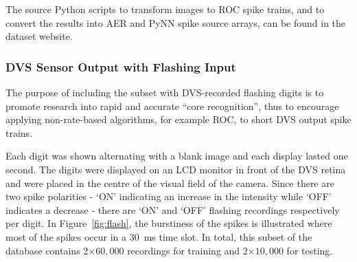 The source Python scripts to transform images to ROC spike trains, and to convert the results into AER and PyNN spike source arrays, can be found in the dataset website.

\subsubsection{DVS Sensor Output with Flashing Input}
\label{subsec_flash}
The purpose of including the subset with DVS-recorded flashing digits is to promote research into rapid and accurate ``core recognition'', thus to encourage applying non-rate-based algorithms, for example ROC, to short DVS output spike trains.

Each digit was shown alternating with a blank image and each display lasted one second.
The digits were displayed on an LCD monitor in front of the DVS retina~\cite{serrano2013128} and were placed in the centre of the visual field of the camera.
Since there are two spike polarities - `ON' indicating an increase in the intensity while `OFF' indicates a decrease - there are `ON' and `OFF' flashing recordings respectively per digit.
In Figure~\ref{fig:flash}, the burstiness of the spikes is illustrated where most of the spikes occur in a 30~ms time slot. 
In total, this subset of the database contains 2$\times$$60,000$ recordings for training and 2$\times$$10,000$ for testing.

